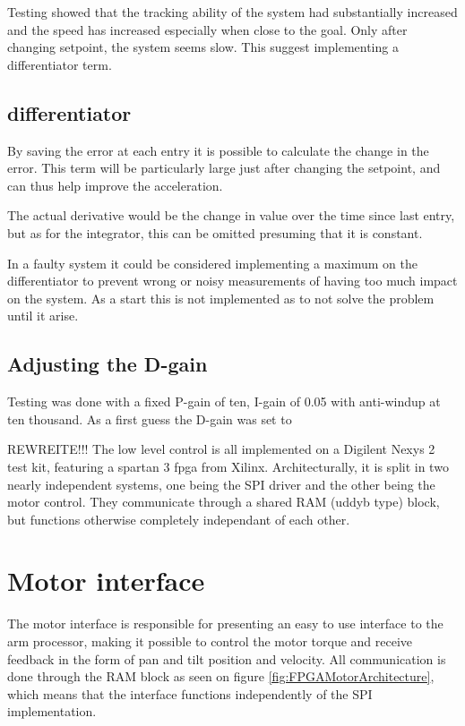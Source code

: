 Testing showed that the tracking ability of the system had substantially increased and the speed has increased especially when close to the goal. Only after changing setpoint, the system seems slow. This suggest implementing a differentiator term.

\subsection{differentiator}
By saving the error at each entry it is possible to calculate the change in the error. This term will be particularly large just after changing the setpoint, and can thus help improve the acceleration.

The actual derivative would be the change in value over the time since last entry, but as for the integrator, this can be omitted presuming that it is constant.

In a faulty system it could be considered implementing a maximum on the differentiator to prevent wrong or noisy measurements of having too much impact on the system. As a start this is not implemented as to not solve the problem until it arise.

\subsection{Adjusting the D-gain}
Testing was done with a fixed P-gain of ten, I-gain of 0.05 with anti-windup at ten thousand. As a first guess the D-gain was set to






REWREITE!!!
The low level control is all implemented on a Digilent Nexys 2 test kit, featuring a spartan 3 fpga from Xilinx.
Architecturally, it is split in two nearly independent systems, one being the SPI driver and the other being the motor control.
They communicate through a shared RAM (uddyb type) block, but functions otherwise completely independant of each other.


\section{Motor interface}
The motor interface is responsible for presenting an easy to use interface to the arm processor, making it possible to control the motor torque and receive feedback in the form of pan and tilt position and velocity.
All communication is done through the RAM block as seen on figure \ref{fig:FPGAMotorArchitecture}, which means that the interface functions independently of the SPI implementation.

